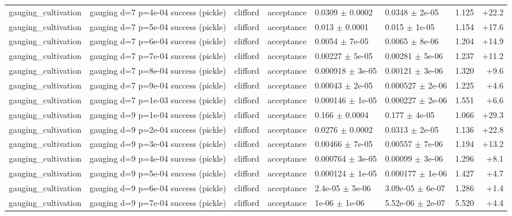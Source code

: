 \documentclass[10pt]{article}
\begin{document}
{\begin{longtable}{l l l l l l r r}
gauging\_cultivation & gauging d=7 p=4e-04 success (pickle) & clifford & acceptance & 0.0309 $\pm$ 0.0002 & 0.0348 $\pm$ 2e-05 & 1.125 & +22.2 \\
gauging\_cultivation & gauging d=7 p=5e-04 success (pickle) & clifford & acceptance & 0.013 $\pm$ 0.0001 & 0.015 $\pm$ 1e-05 & 1.154 & +17.6 \\
gauging\_cultivation & gauging d=7 p=6e-04 success (pickle) & clifford & acceptance & 0.0054 $\pm$ 7e-05 & 0.0065 $\pm$ 8e-06 & 1.204 & +14.9 \\
gauging\_cultivation & gauging d=7 p=7e-04 success (pickle) & clifford & acceptance & 0.00227 $\pm$ 5e-05 & 0.00281 $\pm$ 5e-06 & 1.237 & +11.2 \\
gauging\_cultivation & gauging d=7 p=8e-04 success (pickle) & clifford & acceptance & 0.000918 $\pm$ 3e-05 & 0.00121 $\pm$ 3e-06 & 1.320 & +9.6 \\
gauging\_cultivation & gauging d=7 p=9e-04 success (pickle) & clifford & acceptance & 0.00043 $\pm$ 2e-05 & 0.000527 $\pm$ 2e-06 & 1.225 & +4.6 \\
gauging\_cultivation & gauging d=7 p=1e-03 success (pickle) & clifford & acceptance & 0.000146 $\pm$ 1e-05 & 0.000227 $\pm$ 2e-06 & 1.551 & +6.6 \\
gauging\_cultivation & gauging d=9 p=1e-04 success (pickle) & clifford & acceptance & 0.166 $\pm$ 0.0004 & 0.177 $\pm$ 4e-05 & 1.066 & +29.3 \\
gauging\_cultivation & gauging d=9 p=2e-04 success (pickle) & clifford & acceptance & 0.0276 $\pm$ 0.0002 & 0.0313 $\pm$ 2e-05 & 1.136 & +22.8 \\
gauging\_cultivation & gauging d=9 p=3e-04 success (pickle) & clifford & acceptance & 0.00466 $\pm$ 7e-05 & 0.00557 $\pm$ 7e-06 & 1.194 & +13.2 \\
gauging\_cultivation & gauging d=9 p=4e-04 success (pickle) & clifford & acceptance & 0.000764 $\pm$ 3e-05 & 0.00099 $\pm$ 3e-06 & 1.296 & +8.1 \\
gauging\_cultivation & gauging d=9 p=5e-04 success (pickle) & clifford & acceptance & 0.000124 $\pm$ 1e-05 & 0.000177 $\pm$ 1e-06 & 1.427 & +4.7 \\
gauging\_cultivation & gauging d=9 p=6e-04 success (pickle) & clifford & acceptance & 2.4e-05 $\pm$ 5e-06 & 3.09e-05 $\pm$ 6e-07 & 1.286 & +1.4 \\
gauging\_cultivation & gauging d=9 p=7e-04 success (pickle) & clifford & acceptance & 1e-06 $\pm$ 1e-06 & 5.52e-06 $\pm$ 2e-07 & 5.520 & +4.4 \\

\end{longtable}}
\end{document}
